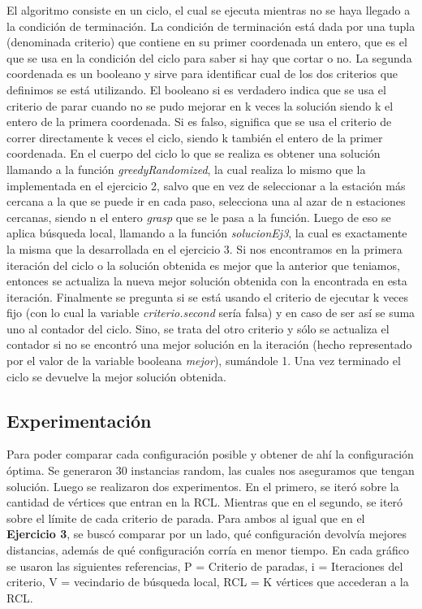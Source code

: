         El algoritmo consiste en un ciclo, el cual se ejecuta mientras no se haya llegado a la condición de terminación. La condición de terminación está dada por una tupla (denominada criterio) que contiene en su primer coordenada un entero, que es el que se usa en la condición del ciclo para saber si hay que cortar o no. La segunda coordenada es un booleano y sirve para identificar cual de los dos criterios que definimos se está utilizando. El booleano si es verdadero indica que se usa el criterio de parar cuando no se pudo mejorar en k veces la solución siendo k el entero de la primera coordenada. Si es falso, significa que se usa el criterio de correr directamente k veces el ciclo, siendo k también el entero de la primer coordenada.
        En el cuerpo del ciclo lo que se realiza es obtener una solución llamando a la función \textit{greedyRandomized}, la cual realiza lo mismo que la implementada en el ejercicio 2, salvo que en vez de seleccionar a la estación más cercana a la que se puede ir en cada paso, selecciona una al azar de n estaciones cercanas, siendo n el entero \textit{grasp} que se le pasa a la función. Luego de eso se aplica búsqueda local, llamando a la función \textit{solucionEj3}, la cual es exactamente la misma que la desarrollada en el ejercicio 3. Si nos encontramos en la primera iteración del ciclo o la solución obtenida es mejor que la anterior que teniamos, entonces se actualiza la nueva mejor solución obtenida con la encontrada en esta iteración.
        Finalmente se pregunta si se está usando el criterio de ejecutar k veces fijo (con lo cual la variable \textit{criterio.second} sería falsa) y en caso de ser así se suma uno al contador del ciclo. Sino, se trata del otro criterio y sólo se actualiza el contador si no se encontró una mejor solución en la iteración (hecho representado por el valor de la variable booleana \textit{mejor}), sumándole 1.
        Una vez terminado el ciclo se devuelve la mejor solución obtenida.

  \subsection{Experimentación}

    Para poder comparar cada configuración posible y obtener de ahí la configuración óptima. Se generaron 30 instancias random, las cuales nos aseguramos que tengan solución. Luego se realizaron dos experimentos. En el primero, se iteró sobre la cantidad de vértices que entran en la RCL. Mientras que en el segundo, se iteró sobre el límite de cada criterio de parada. Para ambos al igual que en el \textbf{Ejercicio 3}, se buscó comparar por un lado, qué configuración devolvía mejores distancias, además de qué configuración corría en menor tiempo. En cada gráfico se usaron las siguientes referencias, P = Criterio de paradas, i = Iteraciones del criterio, V = vecindario de búsqueda local, RCL = K vértices que accederan a la RCL.

